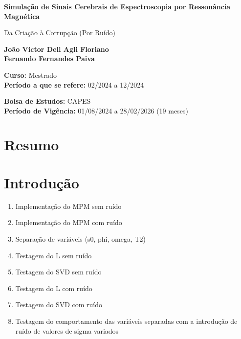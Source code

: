 \documentclass[12pt]{article}
\begin{document}
\begin{titlepage}
    \begin{center}
        \vspace*{1cm}
            
        \Huge
        \textbf{Simulação de Sinais Cerebrais de Espectroscopia por 
        Ressonância Magnética}
            
        \vspace{0.5cm}
        \LARGE
        Da Criação à Corrupção (Por Ruído)
            
        \vspace{1.5cm}
            
        \textbf{João Victor Dell Agli Floriano \\ Fernando Fernandes Paiva}

            
        \vfill
            
        \textbf{Curso:} Mestrado \\
        \textbf{Período a que se refere:} 02/2024 a 12/2024
            
        \vspace{0.8cm}
            
        \Large
        \textbf{Bolsa de Estudos:} CAPES \\
        \textbf{Período de Vigência:} 01/08/2024 a 28/02/2026 (19 meses)
            
    \end{center}
\end{titlepage}


\section{Resumo}

\section{Introdução}

\begin{enumerate}
    \item Implementação do MPM sem ruído
    \item Implementação do MPM com ruído
    \item Separação de variáveis (s0, phi, omega, T2)
    \item Testagem do L sem ruído
    \item Testagem do SVD sem ruído
    \item Testagem do L com ruído
    \item Testagem do SVD com ruído
    \item Testagem do comportamento das variáveis separadas com a introdução de ruído de valores de sigma variados
\end{enumerate}
\end{document}
